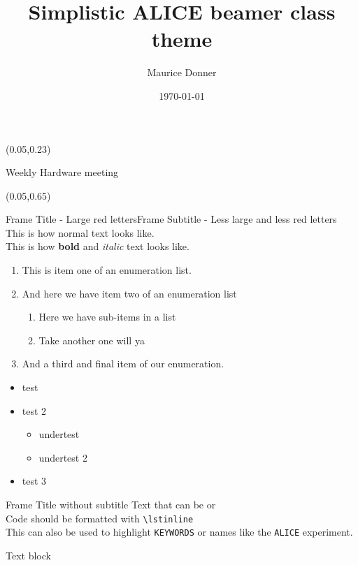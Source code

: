 \documentclass[usenames,dvipsnames,11pt,aspectratio=169,t]{beamer}
\title[ALICE Theme]{Simplistic ALICE beamer class theme}
\date[\today]{\small\today}
\author{Maurice Donner}
\newcommand{\meetingtitle}[1]{\begin{textblock*}{0.9\paperwidth}
(0.05\paperwidth,0.23\paperheight){\begin{center}#1\end{center}}\end{textblock*}}
\newcommand{\smalltitle}[1]{\begin{textblock*}{0.9\paperwidth}
(0.05\paperwidth,0.65\paperheight){\begin{center}\usebeamerfont{title}\LARGE
\color{ARed}{#1}\end{center}}\end{textblock*}}
\begin{document}
\begin{frame}[fragile] %
\thispagestyle{empty}
\titlepage
\meetingtitle{Weekly Hardware meeting}
\smalltitle{- Full template -}
\end{frame}


\begin{frame}{Frame Title - Large red letters}{Frame Subtitle - Less large and less red letters}
    This is how normal text looks like.\\
    This is how \textbf{bold} and \textit{italic} text looks like.
    \begin{enumerate}
	\item This is item one of an enumeration list.
	\item And here we have item two of an enumeration list
	    \begin{enumerate}
	    \item Here we have sub-items in a list
	    \item Take another one will ya
	    \end{enumerate}
	\item And a third and final item of our enumeration.
    \end{enumerate}
    \begin{itemize}
	\item test
	\item test 2
	\begin{itemize}
	    \item undertest
	    \item undertest 2
	\end{itemize}
	\item test 3
    \end{itemize}
\end{frame}


\begin{frame}[fragile]{Frame Title without subtitle}
    Text that can be  or  \\[1cm]
    Code should be formatted with \lstinline!\lstinline! \\[1cm]
    This can also be used to highlight \lstinline!KEYWORDS! or names like
    the \lstinline{ALICE} experiment.
\end{frame}


\begin{frame}{Text block}
    \tiny
    \lipsum[1-5]
\end{frame}

\end{document}
